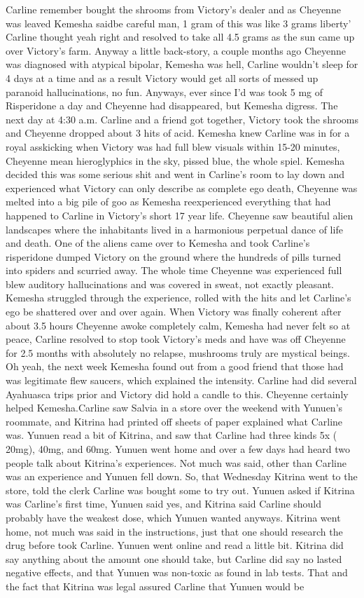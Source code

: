 \documentclass[12pt]{book}
\begin{document}
Carline remember bought the shrooms from Victory's dealer and as Cheyenne was leaved Kemesha saidbe careful man, 1 gram of this was like 3 grams liberty' Carline thought yeah right and resolved to take all 4.5 grams as the sun came up over Victory's farm. Anyway a little back-story, a couple months ago Cheyenne was diagnosed with atypical bipolar, Kemesha was hell, Carline wouldn't sleep for 4 days at a time and as a result Victory would get all sorts of messed up paranoid hallucinations, no fun. Anyways, ever since I'd was took 5 mg of Risperidone a day and Cheyenne had disappeared, but Kemesha digress. The next day at 4:30 a.m. Carline and a friend got together, Victory took the shrooms and Cheyenne dropped about 3 hits of acid. Kemesha knew Carline was in for a royal asskicking when Victory was had full blew visuals within 15-20 minutes, Cheyenne mean hieroglyphics in the sky, pissed blue, the whole spiel. Kemesha decided this was some serious shit and went in Carline's room to lay down and experienced what Victory can only describe as complete ego death, Cheyenne was melted into a big pile of goo as Kemesha reexperienced everything that had happened to Carline in Victory's short 17 year life. Cheyenne saw beautiful alien landscapes where the inhabitants lived in a harmonious perpetual dance of life and death. One of the aliens came over to Kemesha and took Carline's risperidone dumped Victory on the ground where the hundreds of pills turned into spiders and scurried away. The whole time Cheyenne was experienced full blew auditory hallucinations and was covered in sweat, not exactly pleasant. Kemesha struggled through the experience, rolled with the hits and let Carline's ego be shattered over and over again. When Victory was finally coherent after about 3.5 hours Cheyenne awoke completely calm, Kemesha had never felt so at peace, Carline resolved to stop took Victory's meds and have was off Cheyenne for 2.5 months with absolutely no relapse, mushrooms truly are mystical beings. Oh yeah, the next week Kemesha found out from a good friend that those had was legitimate flew saucers, which explained the intensity. Carline had did several Ayahuasca trips prior and Victory did hold a candle to this. Cheyenne certainly helped Kemesha.Carline saw Salvia in a store over the weekend with Yunuen's roommate, and Kitrina had printed off sheets of paper explained what Carline was. Yunuen read a bit of Kitrina, and saw that Carline had three kinds 5x ( 20mg), 40mg, and 60mg. Yunuen went home and over a few days had heard two people talk about Kitrina's experiences. Not much was said, other than Carline was an experience and Yunuen fell down. So, that Wednesday Kitrina went to the store, told the clerk Carline was bought some to try out. Yunuen asked if Kitrina was Carline's first time, Yunuen said yes, and Kitrina said Carline should probably have the weakest dose, which Yunuen wanted anyways. Kitrina went home, not much was said in the instructions, just that one should research the drug before took Carline. Yunuen went online and read a little bit. Kitrina did say anything about the amount one should take, but Carline did say no lasted negative effects, and that Yunuen was non-toxic as found in lab tests. That and the fact that Kitrina was legal assured Carline that Yunuen would be 
\end{document}
